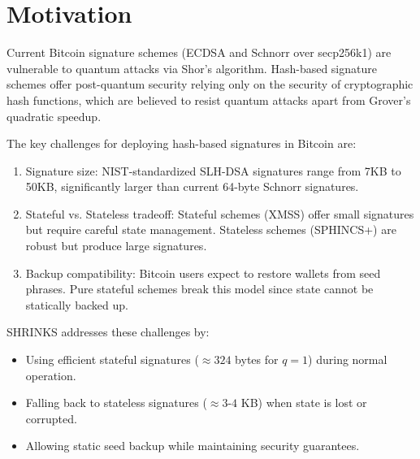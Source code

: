 \section{Motivation}

Current Bitcoin signature schemes (ECDSA and Schnorr over secp256k1) are vulnerable to quantum 
attacks via Shor's algorithm. Hash-based signature schemes offer post-quantum security relying 
only on the security of cryptographic hash functions, which are believed to resist quantum attacks 
apart from Grover's quadratic speedup.

The key challenges for deploying hash-based signatures in Bitcoin are:
\begin{enumerate}
    \item Signature size: NIST-standardized SLH-DSA signatures range from 7KB to 50KB, significantly 
    larger than current 64-byte Schnorr signatures.
    \item Stateful vs. Stateless tradeoff: Stateful schemes (XMSS) offer small signatures but require 
    careful state management. Stateless schemes (SPHINCS+) are robust but produce large signatures.
    \item Backup compatibility: Bitcoin users expect to restore wallets from seed phrases. Pure stateful 
    schemes break this model since state cannot be statically backed up.
\end{enumerate}

SHRINKS addresses these challenges by:
\begin{itemize}
    \item Using efficient stateful signatures ($\approx 324$ bytes for $q=1$) during normal operation.
    \item Falling back to stateless signatures ($\approx 3\text{-}4$ KB) when state is lost or corrupted.
    \item Allowing static seed backup while maintaining security guarantees.
\end{itemize}